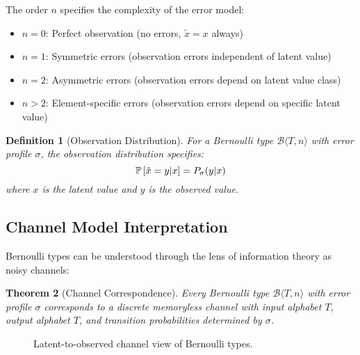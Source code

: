 \documentclass[11pt,final,hidelinks]{article}
\newtheorem{theorem}{Theorem}[section]
\newtheorem{definition}[theorem]{Definition}
\newcommand{\bernoulli}[2]{\mathcal{B}\langle #1, #2 \rangle}
\begin{document}
The order $n$ specifies the complexity of the error model:
\begin{itemize}
    \item $n = 0$: Perfect observation (no errors, $\tilde{x} = x$ always)
    \item $n = 1$: Symmetric errors (observation errors independent of latent value)
    \item $n = 2$: Asymmetric errors (observation errors depend on latent value class)
    \item $n > 2$: Element-specific errors (observation errors depend on specific latent value)
\end{itemize}

\begin{definition}[Observation Distribution]
For a Bernoulli type $\bernoulli{T}{n}$ with error profile $\sigma$, the observation distribution specifies:
\begin{equation}
\mathbb{P}\left[\tilde{x} = y | x\right] = P_\sigma(y|x)
\end{equation}
where $x$ is the latent value and $y$ is the observed value.
\end{definition}

\subsection{Channel Model Interpretation}

Bernoulli types can be understood through the lens of information theory as noisy channels:

\begin{theorem}[Channel Correspondence]
Every Bernoulli type $\bernoulli{T}{n}$ with error profile $\sigma$ corresponds to a discrete memoryless channel with input alphabet $T$, output alphabet $T$, and transition probabilities determined by $\sigma$.
\end{theorem}

\begin{figure}[t]
\centering
{}
\caption{Latent-to-observed channel view of Bernoulli types.}
\end{figure}
\end{document}
